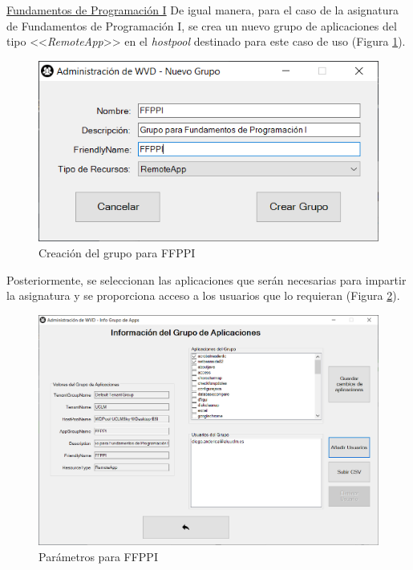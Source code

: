 \clearpage

\noindent\underline{Fundamentos de Programación I}\newline
\indent De igual manera, para el caso de la asignatura de Fundamentos de Programación I, se crea un nuevo grupo de aplicaciones del tipo <<\textit{RemoteApp}>> en el \textit{hostpool} destinado para este caso de uso (Figura \ref{fig:cg_ffppi}).

\begin{figure}[h]
  \centering
  \includegraphics[width=0.6\linewidth]{figures/images/casos_uso/creacion_grupo_ffppi.PNG}
  \caption{Creación del grupo para FFPPI}
  \label{fig:cg_ffppi}
\end{figure}

Posteriormente, se seleccionan las aplicaciones que serán necesarias para impartir la asignatura y se proporciona acceso a los usuarios que lo requieran (Figura \ref{fig:params_ffppi}).

\begin{figure}[h]
  \centering
  \includegraphics[width=0.8\linewidth]{figures/images/casos_uso/params_ffppi.PNG}
  \caption{Parámetros para FFPPI}
  \label{fig:params_ffppi}
\end{figure}

\clearpage

